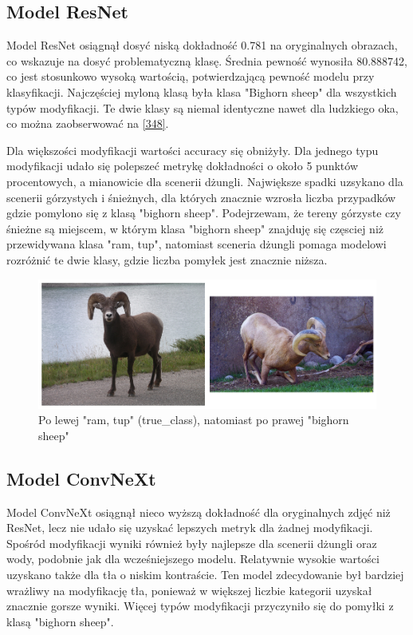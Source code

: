 \subsection*{Model ResNet}

Model ResNet osiągnął dosyć niską dokładność 0.781 na oryginalnych obrazach, co wskazuje na dosyć problematyczną klasę. Średnia pewność wynosiła 80.888742, co jest stosunkowo wysoką wartością, potwierdzającą pewność modelu przy klasyfikacji. Najczęściej myloną klasą była klasa 
"Bighorn sheep" dla wszystkich typów modyfikacji. Te dwie klasy są niemal identyczne nawet dla ludzkiego oka, co można zaobserwować na \ref*{348}.

Dla większości modyfikacji wartości accuracy się obniżyły. Dla jednego typu modyfikacji udało się polepszeć metrykę dokładności o około 5 punktów procentowych, a mianowicie dla scenerii dżungli. Największe spadki uzsykano dla scenerii górzystych i śnieżnych, dla których znacznie wzrosła
liczba przypadków gdzie pomylono się z klasą "bighorn sheep". Podejrzewam, że tereny górzyste czy śnieżne są miejscem, w którym klasa "bighorn sheep" znajduję się częsciej niż przewidywana klasa "ram, tup", natomiast sceneria dżungli pomaga modelowi rozróżnić te dwie klasy, gdzie
liczba pomyłek jest znacznie niższa.


\begin{figure}
	\centering\includegraphics[width=.9\textwidth]{img/348}
	\caption{Po lewej "ram, tup" (true\_class), natomiast po prawej "bighorn sheep"}
	\label{rys:348}
\end{figure}

\subsection*{Model ConvNeXt}

Model ConvNeXt osiągnął nieco wyższą dokładność dla oryginalnych zdjęć niż ResNet, lecz nie udało się uzyskać lepszych metryk dla żadnej modyfikacji. Spośród modyfikacji wyniki również były najlepsze dla scenerii dżungli oraz wody, podobnie jak dla wcześniejszego modelu. Relatywnie 
wysokie wartości uzyskano także dla tła o niskim kontraście. Ten model zdecydowanie był bardziej wrażliwy na modyfikację tła, ponieważ w większej liczbie kategorii uzyskał znacznie gorsze wyniki. Więcej typów modyfikacji przyczyniło się do pomyłki z klasą "bighorn sheep". 

